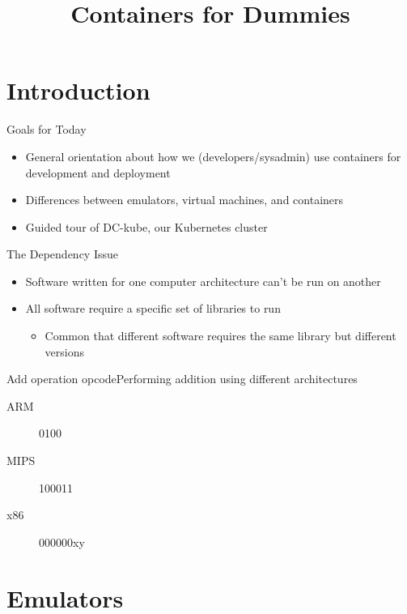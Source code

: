 \documentclass{dcpresentation}
\title{Containers for Dummies}
\author{}
\institute{SciLifeLab Data Centre}
\date{}
\begin{document}

 \section{Introduction}

 \begin{frame}{Goals for Today}
  \begin{itemize}
   \item General orientation about how we (developers/sysadmin) use containers for development and deployment
   \item Differences between emulators, virtual machines, and containers
   \item Guided tour of DC-kube, our Kubernetes cluster
  \end{itemize}
 \end{frame}

 \begin{frame}{The Dependency Issue}
  \begin{itemize}
   \item Software written for one computer architecture can't be run on another
   \item All software require a specific set of libraries to run
   \begin{itemize}
    \item Common that different software requires the same library but different versions
   \end{itemize}
  \end{itemize}
 \end{frame}

 \begin{frame}{Add operation opcode}{Performing addition using different architectures}
  
  \begin{description}
   \item[ARM] 0100
   \item[MIPS] 100011
   \item[x86] 000000xy
  \end{description}
 \end{frame}

 \section{Emulators}
\end{document}
